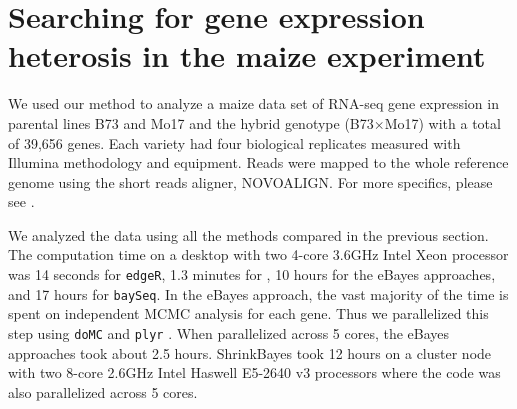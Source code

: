 \documentclass[useAMS,usenatbib,referee]{biom}
\newcommand{\edgeR}{{\tt edgeR}}
\newcommand{\baySeq}{{\tt baySeq}}
\newcommand{\RNAseq}{RNA-seq}
\begin{document}



\section{Searching for gene expression heterosis in the maize experiment}
\label{s:maize}

We used our method to analyze a maize data set \citep{paschold2012complementation} of \RNAseq{} gene expression in parental lines B73 and Mo17 and the hybrid genotype (B73$\times$Mo17) with a total of 39,656 genes. Each variety had four biological replicates measured with Illumina methodology and equipment. Reads were mapped to the whole reference genome using the short reads aligner, NOVOALIGN. For more specifics, please see \cite{paschold2012complementation}. 

We analyzed the data using all the methods compared in the previous section. The computation time on a desktop with two 4-core 3.6GHz Intel Xeon processor was 14 seconds for \edgeR{}, 1.3 minutes for \citeauthor{ji2014estimation}, 10 hours for the eBayes approaches, and 17 hours for \baySeq{}. In the eBayes approach, the vast majority of the time is spent on independent MCMC analysis for each gene. Thus we parallelized this step using {\tt doMC} \citep{revolution2014domc} and {\tt plyr} \citep{hadley2011split}. When parallelized across 5 cores, the eBayes approaches took about 2.5 hours. ShrinkBayes took 12 hours on a cluster node with two 8-core 2.6GHz Intel Haswell E5-2640 v3 processors where the code was also parallelized across 5 cores.
\end{document}
